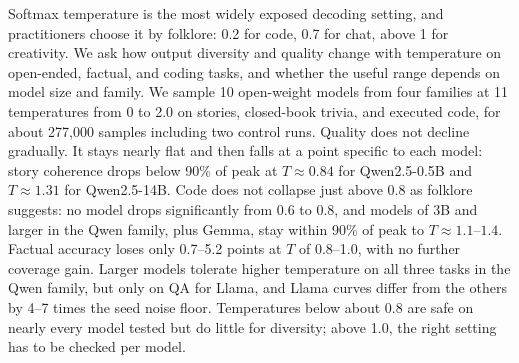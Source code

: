 Softmax temperature is the most widely exposed decoding setting, and practitioners choose it by folklore: 0.2 for code, 0.7 for chat, above 1 for creativity. We ask how output diversity and quality change with temperature on open-ended, factual, and coding tasks, and whether the useful range depends on model size and family. We sample 10 open-weight models from four families at 11 temperatures from 0 to 2.0 on stories, closed-book trivia, and executed code, for about 277,000 samples including two control runs. Quality does not decline gradually. It stays nearly flat and then falls at a point specific to each model: story coherence drops below 90\% of peak at $T \approx 0.84$ for Qwen2.5-0.5B and $T \approx 1.31$ for Qwen2.5-14B. Code does not collapse just above 0.8 as folklore suggests: no model drops significantly from 0.6 to 0.8, and models of 3B and larger in the Qwen family, plus Gemma, stay within 90\% of peak to $T \approx 1.1$--$1.4$. Factual accuracy loses only 0.7--5.2 points at $T$ of 0.8--1.0, with no further coverage gain. Larger models tolerate higher temperature on all three tasks in the Qwen family, but only on QA for Llama, and Llama curves differ from the others by 4--7 times the seed noise floor. Temperatures below about 0.8 are safe on nearly every model tested but do little for diversity; above 1.0, the right setting has to be checked per model.

